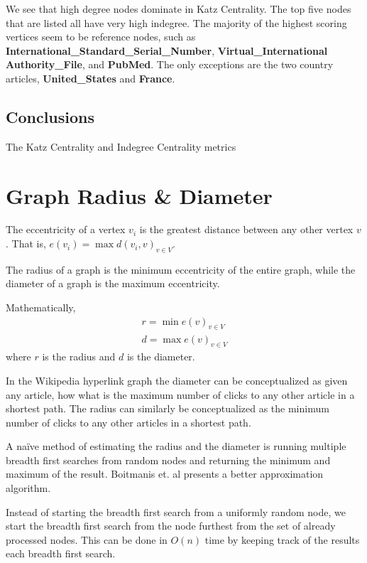 \documentclass{article}
\begin{document}
We see that high degree nodes dominate in Katz Centrality.
The top five nodes that are listed all have very high indegree.
The majority of the highest scoring vertices seem to be reference nodes, such as \textbf{International\_Standard\_Serial\_Number}, \textbf{Virtual\_International Authority\_File}, and \textbf{PubMed}.
The only exceptions are the two country articles, \textbf{United\_States} and \textbf{France}.

\subsection{Conclusions}

The Katz Centrality and Indegree Centrality metrics


\section{Graph Radius \& Diameter}

The eccentricity of a vertex $v_i$ is the greatest distance between any other vertex $v$. That is, $e(v_i) = \max d(v_i, v)_{v \in V}$.

The radius of a graph is the minimum eccentricity of the entire graph, while the diameter of a graph is the maximum eccentricity.


Mathematically,
\begin{align*}
    r = \min e(v)_{v \in V} \\
    d = \max e(v)_{v \in V}
\end{align*}
where $r$ is the radius and $d$ is the diameter.

In the Wikipedia hyperlink graph the diameter can be conceptualized as given any article, how what is the maximum number of clicks to any other article in a shortest path. The radius can similarly be conceptualized as the minimum number of clicks to any other articles in a shortest path.


A naïve method of estimating the radius and the diameter is running multiple breadth first searches from random nodes and returning the minimum and maximum of the result. Boitmanis et. al presents a better approximation algorithm.

Instead of starting the breadth first search from a uniformly random node, we start the breadth first search from the node furthest from the set of already processed nodes. This can be done in $O(n)$ time by keeping track of the results each breadth first search.
\end{document}
